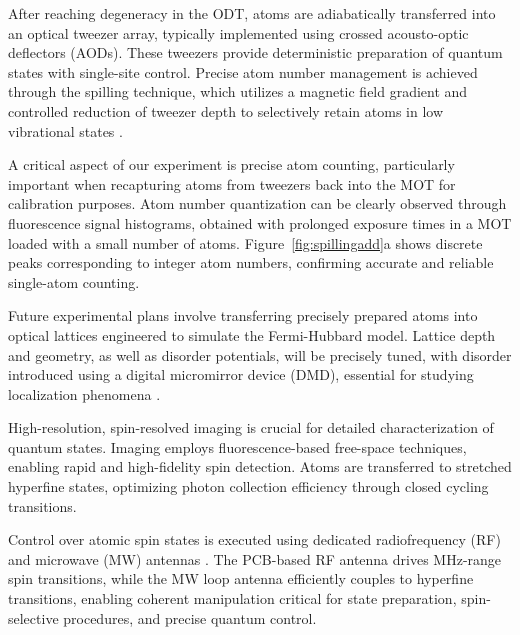 After reaching degeneracy in the ODT, atoms are adiabatically transferred into an optical tweezer array, typically implemented using crossed acousto-optic deflectors (AODs). These tweezers provide deterministic preparation of quantum states with single-site control. Precise atom number management is achieved through the spilling technique, which utilizes a magnetic field gradient and controlled reduction of tweezer depth to selectively retain atoms in low vibrational states \cite{culemann_construction_2024, huang_construction_2024}.

A critical aspect of our experiment is precise atom counting, particularly important when recapturing atoms from tweezers back into the MOT for calibration purposes. Atom number quantization can be clearly observed through fluorescence signal histograms, obtained with prolonged exposure times in a MOT loaded with a small number of atoms. Figure~\ref{fig:spillingadd}a shows discrete peaks corresponding to integer atom numbers, confirming accurate and reliable single-atom counting. 

Future experimental plans involve transferring precisely prepared atoms into optical lattices engineered to simulate the Fermi-Hubbard model. Lattice depth and geometry, as well as disorder potentials, will be precisely tuned, with disorder introduced using a digital micromirror device (DMD), essential for studying localization phenomena \cite{huang_construction_2024}.

High-resolution, spin-resolved imaging is crucial for detailed characterization of quantum states. Imaging employs fluorescence-based free-space techniques, enabling rapid and high-fidelity spin detection. Atoms are transferred to stretched hyperfine states, optimizing photon collection efficiency through closed cycling transitions.

Control over atomic spin states is executed using dedicated radiofrequency (RF) and microwave (MW) antennas
. 
The PCB-based RF antenna 
drives MHz-range spin transitions, while the MW loop antenna 
efficiently couples to hyperfine transitions, enabling coherent manipulation critical for state preparation, spin-selective procedures, and precise quantum control.

